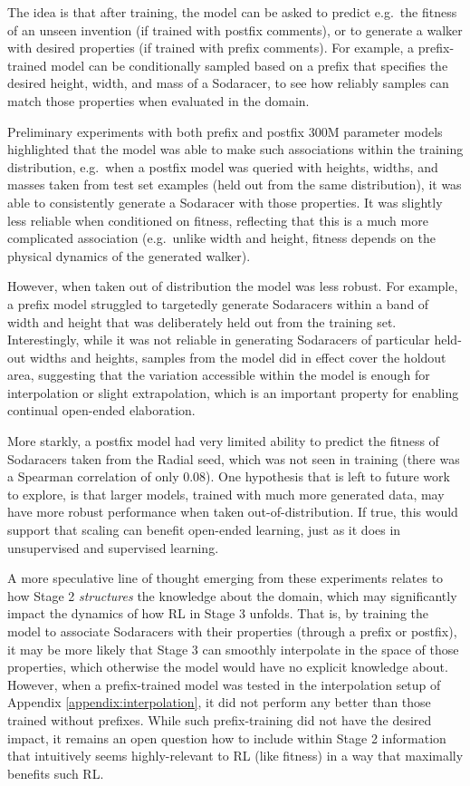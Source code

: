 \documentclass{article}
\begin{document}
The idea is that after training, the model can be asked to
predict e.g.\ the fitness of an unseen invention (if trained with postfix comments), or to generate a walker with desired properties (if trained with prefix comments).
For example, a prefix-trained model can be conditionally sampled based on a prefix that specifies the desired height, width, and mass of a Sodaracer, to see how reliably samples can match those properties when evaluated in the domain.

Preliminary experiments with both prefix and postfix 300M parameter models highlighted that the model was able to make such associations within the training distribution, e.g.\ when a postfix model was queried with heights, widths, and masses taken from test set examples (held out from the same distribution), it was able to consistently generate a Sodaracer with those properties. It was slightly less reliable when conditioned on fitness, reflecting that this is a much more complicated association (e.g.\ unlike width and height, fitness depends on the physical dynamics of the generated walker).

However, when taken out of distribution the model
was less robust. For example, a prefix model struggled to targetedly generate Sodaracers within a band of width and height that was deliberately held out from the training set. Interestingly, while it was not reliable in generating Sodaracers of particular held-out widths and heights, samples from the model did in effect cover
the holdout area, suggesting that the variation accessible within the model is
enough for interpolation or slight extrapolation, which is an important property
for enabling continual open-ended elaboration.

More starkly, a postfix model had very limited ability to predict the
fitness of Sodaracers taken from the Radial seed, which was not seen in training (there was a Spearman correlation of only $0.08$). One hypothesis that is left
to future work to explore, is that larger
models, trained with much more generated data, may have more robust performance
when taken out-of-distribution. If true, this would support that scaling can benefit open-ended learning, just as it does in unsupervised and supervised learning.

A more speculative line of thought emerging from these experiments relates to
how Stage 2 \emph{structures} the knowledge about the domain, which may significantly
impact the dynamics of how RL in Stage 3 unfolds. That is, by training the model
to associate Sodaracers with their properties (through a prefix or postfix), it may
be more likely that Stage 3 can smoothly interpolate in the space of those properties, which otherwise the model would have no explicit knowledge about. However,
when a prefix-trained model was tested in the interpolation setup of 
Appendix \ref{appendix:interpolation}, it did not perform any better than those trained without prefixes. While such prefix-training did not have the desired impact, it remains
an open question how to include within Stage 2 information that intuitively seems highly-relevant to RL (like fitness) in a way that maximally benefits such RL.
\end{document}
